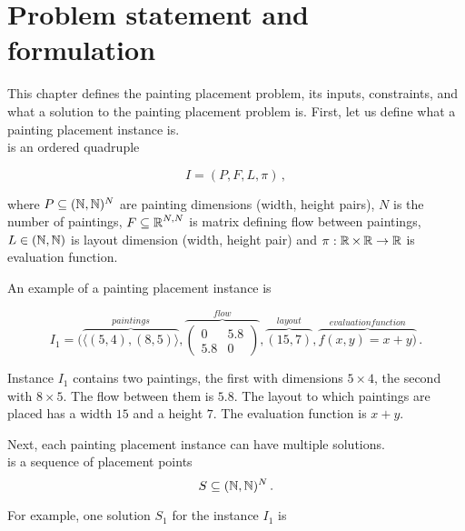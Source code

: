 \chapter{Problem statement and formulation}\label{ch:problem-statement-and-formulation}

This chapter defines the painting placement problem, its inputs, constraints, and what a solution to the painting placement problem is.
First, let us define what a painting placement instance is.\\

 is an ordered quadruple

\begin{equation}
    I = (P, F, L, \pi)\,,
    \label{eq:painting-placement-instance}
\end{equation}

where $P \subseteq (\operatorname*{\mathbb{N}}, \operatorname*{\mathbb{N}})^N$ are painting dimensions (width, height pairs),
$N$ is the number of paintings,
$F \subseteq \operatorname*{\mathbb{R}}^{N, N}$ is matrix defining flow between paintings,
$L \in (\operatorname*{\mathbb{N}}, \operatorname*{\mathbb{N}})$ is layout dimension (width, height pair)
and $\pi: \operatorname*{\mathbb{R}} \times \operatorname*{\mathbb{R}} \to \operatorname*{\mathbb{R}}$ is evaluation function.

An example of a painting placement instance is

\[
    I_1 = (\overbrace{\langle (5,4),(8,5) \rangle}^{paintings},
    \overbrace{\begin{pmatrix}
                   0   & 5.8 \\
                   5.8 & 0
    \end{pmatrix}}^{flow},
    \overbrace{(15,7)}^{layout},
    \overbrace{f(x,y) = x+y)}^{evaluation function}\,.
\]

Instance $I_1$ contains two paintings, the first with dimensions $5\times4$, the second with $8\times5$.
The flow between them is $5.8$.
The layout to which paintings are placed has a width $15$ and a height $7$.
The evaluation function is $x+y$.

Next, each painting placement instance can have multiple solutions.\\

 is a sequence of placement points
\begin{equation}
    S \subseteq (\operatorname*{\mathbb{N}},\operatorname*{\mathbb{N}})^N  \,.
    \label{eq:painting-placement-solution}
\end{equation}

For example, one solution $S_1$ for the instance $I_1$ is

